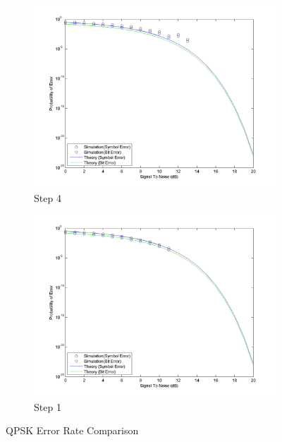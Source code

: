 \documentclass[]{article}
\begin{document}
\newpage
\begin{figure}[h]

        \centering
        \begin{subfigure}[b]{0.6\textwidth}
                \includegraphics[width=\textwidth]{qpSNR.jpg}
                \caption{Step 4}
                \label{fig:qpSNR}
        \end{subfigure}%
        \qquad \quad %
        \begin{subfigure}[b]{0.6\textwidth}
                \includegraphics[width=\textwidth]{qpSNRstep1.jpg}
                \caption{Step 1}
                \label{fig:qpSNR1}
        \end{subfigure}
        \caption{QPSK Error Rate Comparison }
\end{figure}
\end{document}
